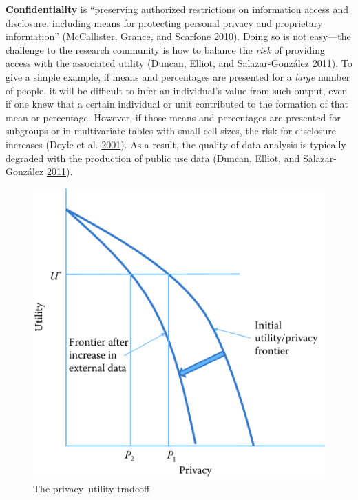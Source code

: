 \documentclass[]{krantz}
\begin{document}
\textbf{Confidentiality} is ``preserving authorized restrictions on
information access and disclosure, including means for protecting
personal privacy and proprietary information'' (McCallister, Grance, and
Scarfone \protect\hyperlink{ref-mccallister2010sp}{2010}). Doing so is
not easy---the challenge to the research community is how to balance the
\emph{risk} of providing access with the associated utility (Duncan,
Elliot, and Salazar-González
\protect\hyperlink{ref-duncanstatistical}{2011}). To give a simple
example, if means and percentages are presented for a \emph{large}
number of people, it will be difficult to infer an individual's value
from such output, even if one knew that a certain individual or unit
contributed to the formation of that mean or percentage. However, if
those means and percentages are presented for subgroups or in
multivariate tables with small cell sizes, the risk for disclosure
increases (Doyle et al.
\protect\hyperlink{ref-doyle2001confidentiality}{2001}). As a result,
the quality of data analysis is typically degraded with the production
of public use data (Duncan, Elliot, and Salazar-González
\protect\hyperlink{ref-duncanstatistical}{2011}).

\begin{figure}

{\centering \includegraphics[width=0.7\linewidth]{ChapterPrivacy/figures/fig11-1} 

}

\caption{The privacy--utility tradeoff}\label{fig:fig11-1}
\end{figure}
\end{document}
